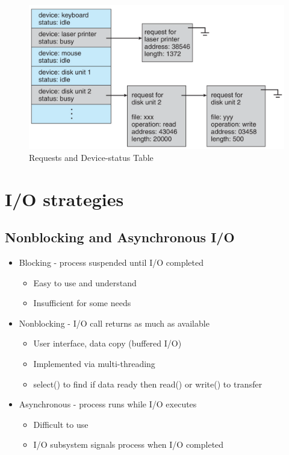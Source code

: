 \begin{figure}[h!]
    \centering
    \includegraphics[width=0.55\linewidth]{img/gnjjfrghn.png}
    \caption{Requests and Device-status Table}
\end{figure}


\section{I/O strategies}

\subsection{Nonblocking and Asynchronous I/O}

\begin{itemize}
    \item Blocking - process suspended until I/O completed
        \begin{itemize}
        \item[] Easy to use and understand
        \item[] Insufficient for some needs
        \end{itemize}
    \item Nonblocking - I/O call returns as much as available
        \begin{itemize}
        \item[] User interface, data copy (buffered I/O)
        \item[] Implemented via multi-threading
        \item[] select() to find if data ready then read() or write() to transfer
        \end{itemize}
    \item Asynchronous - process runs while I/O executes
        \begin{itemize}
        \item[] Difficult to use
        \item[] I/O subsystem signals process when I/O completed
        \end{itemize}
\end{itemize}


